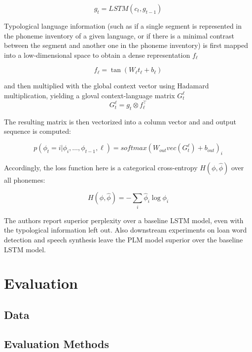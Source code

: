 \documentclass[11pt]{article}
\begin{document}
\begin{equation}
g_t = LSTM(c_t,g_{t-1}) 
\label{eq:plm_2}
\end{equation}

Typological language information (such as if a single segment is represented in the phoneme inventory of a given language, or if there is a minimal contrast between the segment and another one in the phoneme inventory) is first mapped into a low-dimensional space to obtain a dense representation $f_\ell$

\begin{equation}
f_\ell = \tan(W_\ell t_\ell + b_\ell) 
\label{eq:plm_3}
\end{equation}


and then multiplied with the global context vector using Hadamard multiplication, yielding a gloval context-language matrix $G_t^\ell$
\begin{equation}
G_t^\ell = g_t \otimes f_\ell^\top 
\label{eq:plm_4}
\end{equation}


The resulting matrix is then vectorized into a column vector and and output sequence is computed:

\begin{equation}
p(\phi_t = i | \phi_i,\ldots,\phi_{t-1},\ell) = softmax(W_{out}vec(G_t^\ell)+b_{out})_i 
\label{eq:plm_5}
\end{equation}

Accordingly, the loss function here is a categorical cross-entropy $H(\phi,\hat{\phi})$ over all phonemes:

\begin{equation}
H(\phi,\hat{\phi}) = - \sum_i \hat{\phi}_i \log \phi_i
\label{eq:plm_6}
\end{equation}

The authors report superior perplexity over a baseline LSTM model, even with the typological information left out. Also downstream experiments on loan word detection and  speech synthesis leave the PLM model superior over the baseline LSTM model.

\section{Evaluation}
\subsection{Data}
\subsection{Evaluation Methods}
\end{document}

